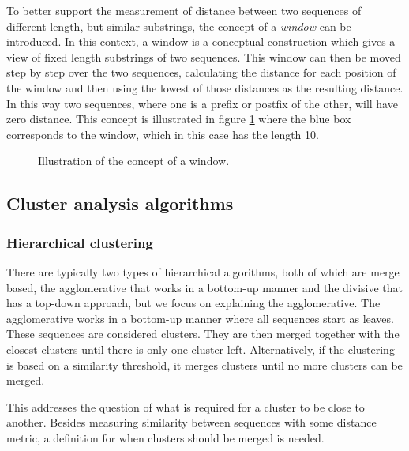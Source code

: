 To better support the measurement of distance between two sequences of
different length, but similar substrings, the concept of a \emph{window} can be
introduced. In this context, a window is a conceptual construction which gives
a view of fixed length substrings of two sequences. This window can then be
moved step by step over the two sequences, calculating the distance for each
position of the window and then using the lowest of those distances as the
resulting distance. In this way two sequences, where one is a prefix or postfix
of the other, will have zero distance. This concept is illustrated in figure
\ref{fig:d2_window_concept} where the blue box corresponds to the window, which
in this case has the length 10.

\begin{figure}[H]
\centering
{}
\caption{Illustration of the concept of a window.}
\label{fig:d2_window_concept}
\end{figure}


\subsection{Cluster analysis algorithms}

\subsubsection{Hierarchical clustering}

There are typically two types of hierarchical algorithms, both of which are
merge based, the agglomerative that works in a bottom-up manner and the
divisive that has a top-down approach, but we focus on explaining the
agglomerative. The agglomerative works in a bottom-up manner where all
sequences start as leaves. These sequences are considered clusters. They are
then merged together with the closest clusters until there is only one cluster
left. Alternatively, if the clustering is based on a similarity threshold, it
merges clusters until no more clusters can be merged.


This addresses the question of what is required for a cluster to be close to another.
Besides measuring similarity between sequences with some distance
metric, a definition for when clusters should be merged is needed.

